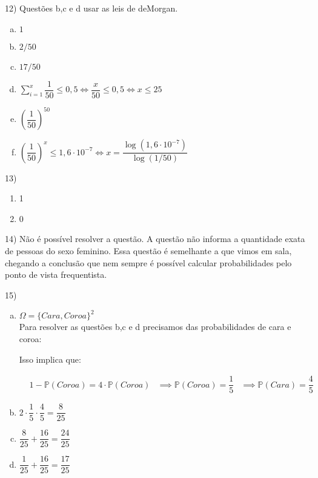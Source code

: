 \documentclass{article}
\begin{document}
12) Questões b,c e d usar as leis de deMorgan. 

\begin{enumerate}[a)]
    \item $1$
    \item $2/50$ 
    \item $17/50 $
    \item $\sum_{i=1}^x \dfrac{1}{50} \leq 0,5 \iff \dfrac{x}{50} \leq 0,5 \iff x \leq 25 $
    \item $\left( \dfrac{1}{50}\right)^{50}$
    \item $\left(\dfrac{1}{50}\right)^x \leq 1,6 \cdot 10^{-7} \iff x = \dfrac{\log(1,6 \cdot 10^{-7})}{\log(1/50)}$
\end{enumerate}

13) 

\begin{enumerate}
    \item 1
    \item 0
\end{enumerate}

14) Não é possível resolver a questão. A questão não informa a quantidade exata de pessoas do sexo feminino. Essa questão é semelhante a que vimos em sala, 
chegando a conclusão que nem sempre é possível calcular probabilidades pelo ponto de vista frequentista. 

15)

\begin{enumerate}[a)]
    \item $\Omega = \{Cara, Coroa\}^2$\\
     Para resolver as questões b,c e d precisamos das probabilidades de cara e coroa:

Isso implica que:

\begin{align*}
&1 - \mathds{P}(Coroa)   =  4 \cdot \mathds{P}(Coroa)
&\implies  \mathds{P}(Coroa) = \dfrac{1}{5}
&\implies \mathds{P}(Cara) = \dfrac{4}{5}
\end{align*}
    \item $2 \cdot {} \cdot {} = $ 
    \item $ +  = $
    \item  $ +  = $
\end{enumerate}
\end{document}
